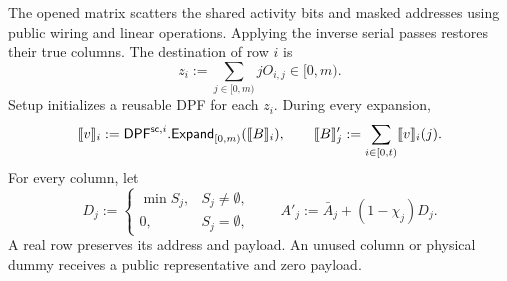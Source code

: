 The opened matrix scatters the shared activity bits and masked addresses using
public wiring and linear operations.  Applying the inverse serial passes
restores their true columns.  The destination of row $i$ is
\begin{equation}\label{eq:waterfall-row-destination}
 z_i:=\sum_{j\in[0,m)}jO_{i,j}\in[0,m).
\end{equation}
Setup initializes a reusable DPF for each $z_i$.  During every expansion,
\begin{equation}\label{eq:waterfall-value-scatter}
 \share v_i:=\mathsf{DPF}^{\mathsf{sc},i}.\mathsf{Expand}_{[0,m)}(\share B_i),
 \qquad
 \share B'_j:=\sum_{i\in[0,t)}\share v_i(j).
\end{equation}
For every column, let
\begin{equation}\label{eq:waterfall-scatter-representative}
 D_j:=\begin{cases}\min S_j,&S_j\neq\emptyset,\\0,&S_j=\emptyset,\end{cases}
 \qquad A'_j:=\bar A_j+(1-\chi_j)D_j.
\end{equation}
A real row preserves its address and payload.  An unused column or physical
dummy receives a public representative and zero payload.

